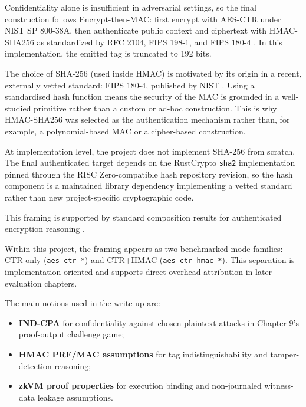 Confidentiality alone is insufficient in adversarial settings, so the final
construction follows Encrypt-then-MAC: first encrypt with AES-CTR under NIST SP
800-38A, then authenticate public context and ciphertext with HMAC-SHA256 as
standardized by RFC 2104, FIPS 198-1, and FIPS 180-4
\cite{nistsp80038a,rfc2104,nistfips1981,nistfips1804}. In this implementation,
the emitted tag is truncated to 192 bits.

The choice of SHA-256 (used inside HMAC) is motivated by its origin in a
recent, externally vetted standard: FIPS 180-4, published by NIST
\cite{nistfips1804}. Using a standardised hash function means the security of
the MAC is grounded in a well-studied primitive rather than a custom or
ad-hoc construction. This is why HMAC-SHA256 was selected as the authentication
mechanism rather than, for example, a polynomial-based MAC or a cipher-based
construction.

At implementation level, the project does not implement SHA-256 from scratch.
The final authenticated target depends on the RustCrypto \texttt{sha2}
implementation pinned through the RISC Zero-compatible hash repository revision,
so the hash component is a maintained library dependency implementing a vetted
standard rather than new project-specific cryptographic code.

This framing is supported by standard composition results for authenticated
encryption reasoning \cite{bellare2000authenticated}.

Within this project, the framing appears as two benchmarked mode families:
CTR-only (\texttt{aes-ctr-*}) and CTR+HMAC (\texttt{aes-ctr-hmac-*}). This
separation is implementation-oriented and supports direct overhead attribution in
later evaluation chapters.

The main notions used in the write-up are:

\begin{itemize}
\item \textbf{IND-CPA} for confidentiality against chosen-plaintext attacks
in Chapter 9's proof-output challenge game;
\item \textbf{HMAC PRF/MAC assumptions} for tag indistinguishability and
tamper-detection reasoning;
\item \textbf{zkVM proof properties} for execution binding and non-journaled
witness-data leakage assumptions.
\end{itemize}
